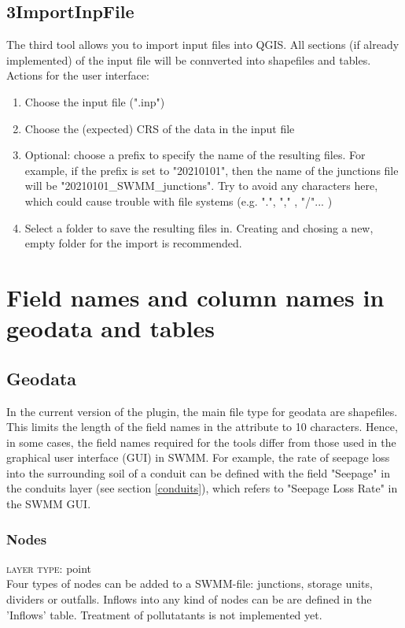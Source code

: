 \documentclass[10pt,a4paper,oneside]{scrbook}
\begin{document}
\section{3\textunderscore ImportInpFile} \label{tool3}
The third tool allows you to import input files into QGIS. All sections (if already implemented) of the input file will be connverted into shapefiles and tables. Actions for the user interface:
\begin{enumerate}
	\setlength\itemsep{0pt}
	\item Choose the input file (".inp")
	\item Choose the (expected) CRS of the data in the input file
	\item Optional: choose a prefix to specify the name of the resulting files. For example, if the prefix is set to "20210101", then the name of the junctions file will be "20210101\_SWMM\_junctions". Try to avoid any characters here, which could cause trouble with file systems (e.g. ".", "," , "/"... )
	\item Select a folder to save the resulting files in. Creating and chosing a new, empty folder for the import is recommended.
\end{enumerate}


\chapter{Field names and column names in geodata and tables} \label{fieldnames}

\section{Geodata} \label{geodata}
In the current version of the plugin, the main file type for geodata are shapefiles. This limits the length of the field names in the attribute to 10 characters. Hence, in some cases, the field names required for the tools differ from those used in the graphical user interface (GUI) in SWMM. For example, the rate of seepage loss into the surrounding soil of a conduit can be defined with the field "Seepage" in the conduits layer (see section \ref{conduits}), which refers to "Seepage Loss Rate" in the SWMM GUI.

\subsection{Nodes} \label{nodes}
\textsc{layer type}: point \\
Four types of nodes can be added to a SWMM-file:
junctions, storage units, dividers or outfalls. Inflows into any kind of nodes can be are defined in the 'Inflows' table. Treatment of pollutatants is not implemented yet.
\end{document}
